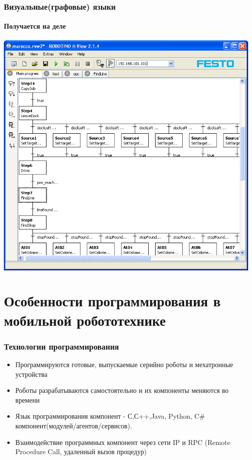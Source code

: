 \documentclass{beamer}
\begin{document}
\begin{frame}
\frametitle{Визуальные(графовые) языки}
\framesubtitle{Получается на деле}
\includegraphics[scale=0.4]{robotino2.png}
\end{frame}


\section{Особенности программирования в мобильной робототехнике}
\begin{frame}
\frametitle{Технологии программирования}
\begin{itemize}
\item<1> Программируются готовые, выпускаемые серийно роботы и мехатронные
устройства
\item<2> \alert{Роботы разрабатываются самостоятельно и их компоненты меняются
во времени}
\item<1-> Язык программирования компонент - С,С++,Java, Python, C\#
компонент(модулей/агентов/сервисов).
\item<1-> Взаимодействие программных компонент через сети IP и RPC
(Remote Procedure Call, удаленный вызов процедур)
\end{itemize}
\end{frame}
\end{document}
